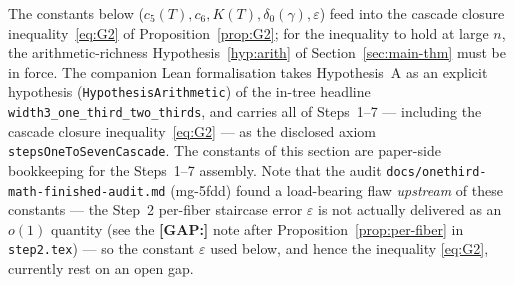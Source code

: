 \begin{remark}\label{rem:G2-hyp-arith}
The constants below ($c_5(T), c_6, K(T), \delta_0(\gamma),
\varepsilon$) feed into the cascade closure
inequality~\eqref{eq:G2} of Proposition~\ref{prop:G2}; for the
inequality to hold at large $n$, the arithmetic-richness
Hypothesis~\ref{hyp:arith} of Section~\ref{sec:main-thm} must be in
force. The companion Lean formalisation takes Hypothesis~A as an
explicit hypothesis (\texttt{HypothesisArithmetic}) of the in-tree
headline \texttt{width3\_one\_third\_two\_thirds}, and carries all of
Steps~1--7 --- including the cascade closure inequality~\eqref{eq:G2}
--- as the disclosed axiom \texttt{stepsOneToSevenCascade}. The
constants of this section are paper-side bookkeeping for the
Steps~1--7 assembly. Note that the audit
\texttt{docs/onethird-math-finished-audit.md} (mg-5fdd) found a
load-bearing flaw \emph{upstream} of these constants --- the Step~2
per-fiber staircase error $\varepsilon$ is not actually delivered as
an $o(1)$ quantity (see the \textbf{[GAP:]} note after
Proposition~\ref{prop:per-fiber} in \texttt{step2.tex}) --- so the
constant $\varepsilon$ used below, and hence the inequality
\eqref{eq:G2}, currently rest on an open gap.
\end{remark}

